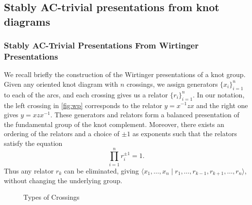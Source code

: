 
\subsection{Stably AC-trivial presentations from knot diagrams} \label{subsec:ac-unknot}



\subsubsection{Stably AC-Trivial Presentations From Wirtinger Presentations}

We recall briefly the construction of the Wirtinger presentations of a knot group. Given any oriented knot diagram with $n$ crossings, we assign generators $\{x_i\}_{i=1}^n$ to each of the arcs, and each crossing gives us a relator $\{r_i\}_{i=1}^n$. In our notation, the left crossing in \autoref{fig:wp} corresponds to the relator $y=x^{-1}zx$ and the right one gives $y=xzx^{-1}$. These generators and relators form a balanced presentation of the fundamental group of the knot complement. Moreover, there exists an ordering of the relators and a choice of $\pm 1$ as exponents such that the relators satisfy the equation
$$\prod_{i=1}^nr_i^{\pm1}=1.
$$
Thus any relator $r_k$ can be eliminated, giving $\langle x_1,\ldots,x_n\mid r_1,\ldots,r_{k-1},r_{k+1},\ldots,r_n\rangle$, without changing the underlying group. 


\begin{figure}
    \centering
{}
    \caption{Types of Crossings}
    \label{fig:wp}
\end{figure}

